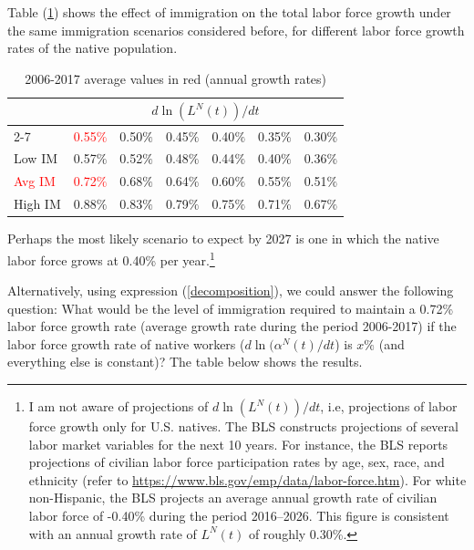 \documentclass[
    abstract=true,
    11pt,
    letterpaper,
    oneside,
    headinclude,
    footinclude,
    BCOR=5mm,
]{scrartcl}
\begin{document}
Table (\ref{tab:diff_LNagr}) shows the effect of immigration on the total labor force growth under the same immigration scenarios considered before, for different labor force growth rates of the native population.

\begin{table}[H] 
\centering
\begin{tabular}{l|llllll} \hline
\multirow{2}{*}{} & \multicolumn{6}{c}{$d \ln(L^N(t))/dt$}           \\ \cline{2-7}
                  & \textcolor{red}{0.55$\%$} & 0.50$\%$ & 0.45$\%$ & 0.40$\%$ & 0.35$\%$ & 0.30$\%$ \\ \hline
Low IM            & 0.57$\%$ & 0.52$\%$ & 0.48$\%$ & 0.44$\%$ & 0.40$\%$ & 0.36$\%$ \\
\textcolor{red}{Avg IM}            & \textcolor{red}{0.72$\%$} & 0.68$\%$ & 0.64$\%$ & 0.60$\%$ & 0.55$\%$ & 0.51$\%$ \\
High IM           & 0.88$\%$ & 0.83$\%$ & 0.79$\%$ & 0.75$\%$ & 0.71$\%$ & 0.67$\%$ \\ \hline
\end{tabular}
\caption{2006-2017 average values in red (annual growth rates)} \label{tab:diff_LNagr}
\end{table}

Perhaps the most likely scenario to expect by 2027 is one in which the native labor force grows at 0.40\% per year.\footnote{I am not aware of projections of $d \ln(L^N(t))/dt$, i.e, projections of labor force growth only for U.S. natives. The BLS constructs projections of several labor market variables for the next 10 years. For instance, the BLS reports projections of civilian labor force participation rates by age, sex, race, and ethnicity (refer to \url{https://www.bls.gov/emp/data/labor-force.htm}). For white non-Hispanic, the BLS projects an average annual growth rate of civilian labor force of -0.40\% during the period 2016--2026. This figure is consistent with an annual growth rate of $L^N(t)$ of roughly 0.30\%.}

Alternatively, using expression (\ref{decomposition}), we could answer the following question: What would be the level of immigration required to maintain a 0.72\% labor force growth rate (average growth rate during the period 2006-2017) if the labor force growth rate of native workers ($d\ln(\alpha^N(t)/dt$) is $x\%$ (and everything else is constant)? The table below shows the results.
\end{document}
